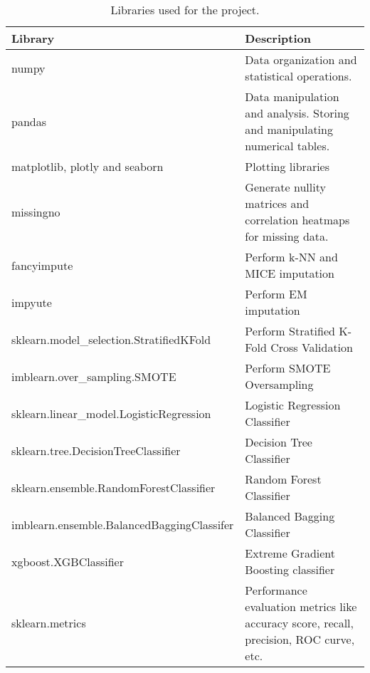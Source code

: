 \begin{table}[h!]
\begin{center}
 \begin{tabular}{ | p{7.7cm}| p{7cm} | }
 \hline
  Library & Description

  \\ [0.5ex] 
 \hline\hline
     numpy & Data organization and statistical operations. \\
    \hline pandas & Data manipulation and analysis. Storing and manipulating numerical tables. \\
    \hline matplotlib, plotly and seaborn & Plotting libraries \\
    \hline missingno & Generate nullity matrices and correlation heatmaps for missing data. \\
    \hline fancyimpute & Perform k-NN and MICE imputation \\
    \hline impyute & Perform EM imputation \\
    \hline sklearn.model\_selection.StratifiedKFold & Perform Stratified K-Fold Cross Validation \\
    \hline imblearn.over\_sampling.SMOTE & Perform SMOTE Oversampling \\
    \hline sklearn.linear\_model.LogisticRegression & Logistic Regression Classifier \\
    \hline sklearn.tree.DecisionTreeClassifier & Decision Tree Classifier \\
    \hline sklearn.ensemble.RandomForestClassifier & Random Forest Classifier \\
    \hline imblearn.ensemble.BalancedBaggingClassifer & Balanced Bagging Classifier \\
    \hline xgboost.XGBClassifier & Extreme Gradient Boosting classifier \\
    \hline sklearn.metrics & Performance evaluation metrics like accuracy score, recall, precision, ROC curve, etc. \\
\hline

\end{tabular}
\end{center}

	\caption{Libraries used for the project.}
\label{table:LibUsed}
\end{table}


